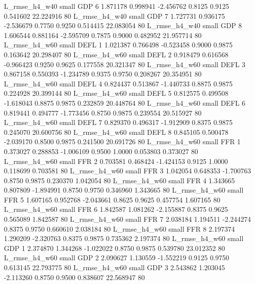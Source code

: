  L_rmse_h4_w40      small      GDP                 6 1.871178 0.998941 -2.456762 0.8125 0.9125  0.541602   22.224916 80
 L_rmse_h4_w40      small      GDP                 7 1.727731 0.936175 -2.536679 0.7750 0.9250  0.514415   22.083054 80
 L_rmse_h4_w40      small      GDP                 8 1.606544 0.881164 -2.595709 0.7875 0.9000  0.482952   21.957714 80
 L_rmse_h4_w60      small     DEFL                 1 1.021387 0.766498 -0.523458 0.9000 0.9875  0.163642   20.298407 80
 L_rmse_h4_w60      small     DEFL                 2 0.918479 0.616568 -0.966423 0.9250 0.9625  0.177558   20.321347 80
 L_rmse_h4_w60      small     DEFL                 3 0.867158 0.550393 -1.234789 0.9375 0.9750  0.208267   20.354951 80
 L_rmse_h4_w60      small     DEFL                 4 0.824437 0.513867 -1.440733 0.8875 0.9875  0.224928   20.399144 80
 L_rmse_h4_w60      small     DEFL                 5 0.812575 0.499508 -1.618043 0.8875 0.9875  0.232859   20.448764 80
 L_rmse_h4_w60      small     DEFL                 6 0.819441 0.494777 -1.773456 0.8750 0.9875  0.239554   20.515927 80
 L_rmse_h4_w60      small     DEFL                 7 0.829370 0.496317 -1.912909 0.8375 0.9875  0.245070   20.600756 80
 L_rmse_h4_w60      small     DEFL                 8 0.845105 0.500478 -2.039170 0.8500 0.9875  0.241500   20.691726 80
 L_rmse_h4_w60      small      FFR                 1 0.373027 0.288853 -1.006109 0.9500 1.0000  0.053803    0.373027 80
 L_rmse_h4_w60      small      FFR                 2 0.703581 0.468424 -1.424153 0.9125 1.0000  0.118699    0.703581 80
 L_rmse_h4_w60      small      FFR                 3 1.042054 0.648353 -1.700763 0.8750 0.9875  0.230370    1.042054 80
 L_rmse_h4_w60      small      FFR                 4 1.343665 0.807809 -1.894991 0.8750 0.9750  0.346960    1.343665 80
 L_rmse_h4_w60      small      FFR                 5 1.607165 0.952768 -2.043661 0.8625 0.9625  0.457754    1.607165 80
 L_rmse_h4_w60      small      FFR                 6 1.842587 1.081262 -2.155887 0.8375 0.9625  0.565089    1.842587 80
 L_rmse_h4_w60      small      FFR                 7 2.038184 1.194511 -2.244274 0.8375 0.9750  0.660610    2.038184 80
 L_rmse_h4_w60      small      FFR                 8 2.197374 1.290209 -2.320763 0.8375 0.9875  0.735362    2.197374 80
 L_rmse_h4_w60      small      GDP                 1 2.374870 1.344268 -1.022022 0.8750 0.9875  0.539780   23.012352 80
 L_rmse_h4_w60      small      GDP                 2 2.090627 1.130559 -1.552219 0.9125 0.9750  0.613145   22.793775 80
 L_rmse_h4_w60      small      GDP                 3 2.543862 1.203045 -2.113260 0.8750 0.9500  0.838607   22.568947 80
